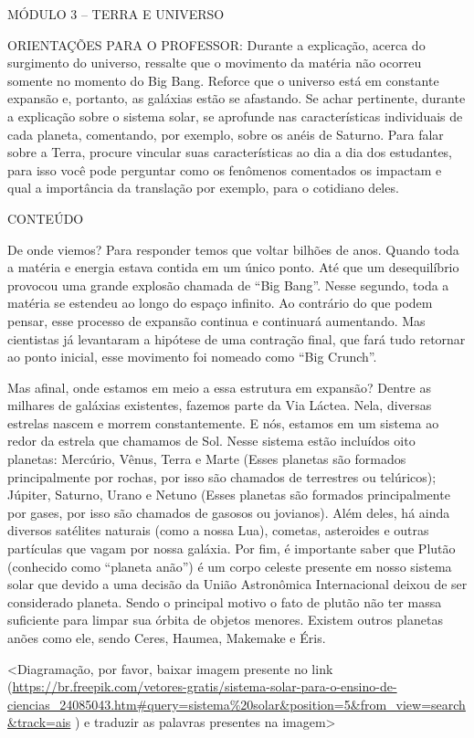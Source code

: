 MÓDULO 3 -- TERRA E UNIVERSO

ORIENTAÇÕES PARA O PROFESSOR: Durante a explicação, acerca do surgimento
do universo, ressalte que o movimento da matéria não ocorreu somente no
momento do Big Bang. Reforce que o universo está em constante expansão
e, portanto, as galáxias estão se afastando. Se achar pertinente,
durante a explicação sobre o sistema solar, se aprofunde nas
características individuais de cada planeta, comentando, por exemplo,
sobre os anéis de Saturno. Para falar sobre a Terra, procure vincular
suas características ao dia a dia dos estudantes, para isso você pode
perguntar como os fenômenos comentados os impactam e qual a importância
da translação por exemplo, para o cotidiano deles.

CONTEÚDO

De onde viemos? Para responder temos que voltar bilhões de anos. Quando
toda a matéria e energia estava contida em um único ponto. Até que um
desequilíbrio provocou uma grande explosão chamada de ``Big Bang''.
Nesse segundo, toda a matéria se estendeu ao longo do espaço infinito.
Ao contrário do que podem pensar, esse processo de expansão continua e
continuará aumentando. Mas cientistas já levantaram a hipótese de uma
contração final, que fará tudo retornar ao ponto inicial, esse movimento
foi nomeado como ``Big Crunch''.

Mas afinal, onde estamos em meio a essa estrutura em expansão? Dentre as
milhares de galáxias existentes, fazemos parte da Via Láctea. Nela,
diversas estrelas nascem e morrem constantemente. E nós, estamos em um
sistema ao redor da estrela que chamamos de Sol. Nesse sistema estão
incluídos oito planetas: Mercúrio, Vênus, Terra e Marte (Esses planetas
são formados principalmente por rochas, por isso são chamados de
terrestres ou telúricos); Júpiter, Saturno, Urano e Netuno (Esses
planetas são formados principalmente por gases, por isso são chamados de
gasosos ou jovianos). Além deles, há ainda diversos satélites naturais
(como a nossa Lua), cometas, asteroides e outras partículas que vagam
por nossa galáxia. Por fim, é importante saber que Plutão (conhecido
como ``planeta anão'') é um corpo celeste presente em nosso sistema
solar que devido a uma decisão da União Astronômica Internacional deixou
de ser considerado planeta. Sendo o principal motivo o fato de plutão
não ter massa suficiente para limpar sua órbita de objetos menores.
Existem outros planetas anões como ele, sendo Ceres, Haumea, Makemake e
Éris.

\textless{}Diagramação, por favor, baixar imagem presente no link
(\url{https://br.freepik.com/vetores-gratis/sistema-solar-para-o-ensino-de-ciencias_24085043.htm\#query=sistema\%20solar\&position=5\&from_view=search\&track=ais}
) e traduzir as palavras presentes na imagem\textgreater{}

